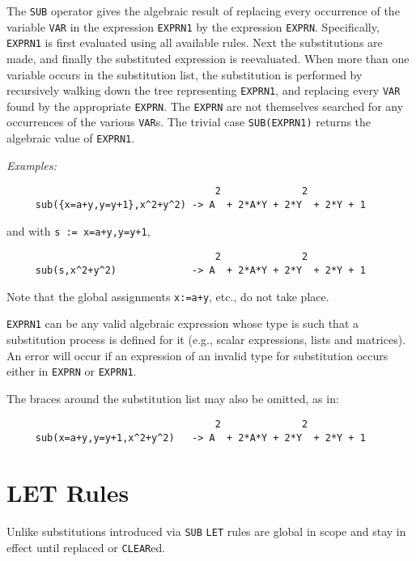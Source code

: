 The {\tt SUB} operator gives the algebraic result of replacing every
occurrence of the variable {\tt VAR} in the expression {\tt EXPRN1} by the
expression {\tt EXPRN}.  Specifically, {\tt EXPRN1} is first evaluated
using all available rules.  Next the substitutions are made, and finally
the substituted expression is reevaluated.  When more than one variable
occurs in the substitution list, the substitution is performed by
recursively walking down the tree representing {\tt EXPRN1}, and replacing
every {\tt VAR} found by the appropriate {\tt EXPRN}.  The {\tt EXPRN} are
not themselves searched for any occurrences of the various {\tt VAR}s.
The trivial case {\tt SUB(EXPRN1)} returns the algebraic value of
{\tt EXPRN1}.

{\it Examples:}
\begin{verbatim}
                                    2              2
     sub({x=a+y,y=y+1},x^2+y^2) -> A  + 2*A*Y + 2*Y  + 2*Y + 1
\end{verbatim}
and with {\tt s := {x=a+y,y=y+1}},
\begin{verbatim}
                                    2              2
     sub(s,x^2+y^2)             -> A  + 2*A*Y + 2*Y  + 2*Y + 1
\end{verbatim}

Note that the global assignments {\tt x:=a+y}, etc., do not take place.

{\tt EXPRN1} can be any valid algebraic expression whose type is such that
a substitution process is defined for it (e.g., scalar expressions, lists
and matrices).  An error will occur if an expression of an invalid type
for substitution occurs either in {\tt EXPRN} or {\tt EXPRN1}.

The braces around the substitution list may also be omitted, as in:

\begin{verbatim}
                                    2              2
     sub(x=a+y,y=y+1,x^2+y^2)   -> A  + 2*A*Y + 2*Y  + 2*Y + 1
\end{verbatim}

\section{LET Rules}  
Unlike substitutions introduced via {\tt SUB} {\tt LET}
rules are global in scope and stay in effect until replaced or {\tt CLEAR}ed.

